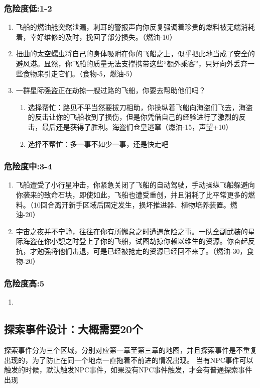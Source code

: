 \documentclass{ctexart}
\begin{document}
			\subsubsection{危险度低:1-2}
			\begin{enumerate}
				\item 飞船的燃油舱突然泄漏，刺耳的警报声向你反复强调着珍贵的燃料被无端消耗着，幸好维修的及时，挽回了部分损失。（燃油-10）
				\item 扭曲的太空蠕虫将自己的身体吸附在你的飞船之上，似乎把此地当成了安全的避风港。显然，你飞船的质量无法支撑携带这些“额外乘客”，只好向外丢弃一些食物来引走它们。（食物-5，燃油-5）
				\item 一群星际强盗正在劫掠一艘过路的飞船，你要去帮助他们吗？
					\begin{enumerate}
					\item 选择帮忙：路见不平当然要拔刀相助，你操纵着飞船向海盗们飞去，海盗的反击让你的飞船收到了损伤，但是你凭借自己的经验进行了激烈的反击，最后还是获得了胜利。海盗们仓皇逃窜（燃油-15，声望+10）
					\item 选择不帮忙：多一事不如少一事，还是快走吧
					\end{enumerate}
			\end{enumerate}
			\subsubsection{危险度中:3-4}
			\begin{enumerate}
				\item 飞船遭受了小行星冲击，你紧急关闭了飞船的自动驾驶，手动操纵飞船躲避向你袭来的致命石块，即使如此，飞船也遭受重创，并且消耗了比平常更多的燃料。（10回合离开新手区域后固定发生，损坏推进器、植物培养装置。燃油-20）
				\item 宇宙之夜并不宁静，往往在你有所懈怠之时遭遇危险之事。一队全副武装的星际海盗在你小憩之时登上了你的飞船，试图劫掠你赖以维生的资源。你奋起反抗，才勉强将他们击退，可是已经被抢走的资源已经回不来了。（燃油-30，食物-20）
			\end{enumerate}
			\subsubsection{危险度高:5}
			\begin{enumerate}
				\item 
			\end{enumerate}
		\subsection{探索事件设计：大概需要20个}
			探索事件分为三个区域，分别对应第一章至第三章的地图，并且探索事件是不重复出现的，为了防止在同一个地点一直拖着不前进的情况出现。
			当有NPC事件可以触发的时候，默认触发NPC事件，如果没有NPC事件触发，才会有普通探索事件出现
\end{document}

